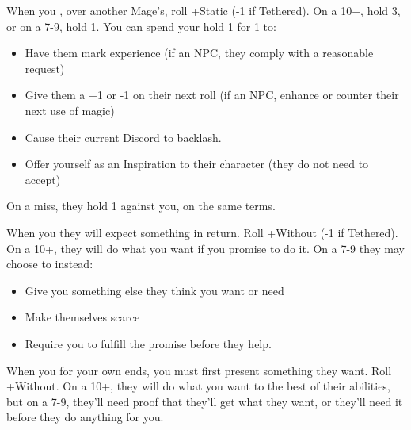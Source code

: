 



\begin{multicols}{3}

  \begin{move}
    When you ,  over another Mage’s, roll +Static (-1 if Tethered). On a 10+, hold 3, or on a 7-9, hold 1. You can spend your hold 1 for 1 to:

    \begin{itemize}
      \setlength\itemsep{-.5em}
    \item Have them mark experience (if an NPC, they comply with a reasonable request)
    \item Give them a +1 or -1 on their next roll (if an NPC, enhance or counter their next use of magic)
    \item Cause their current Discord to backlash. 
    \item Offer yourself as an Inspiration to their character (they do not need to accept)
    \end{itemize}
    On a miss, they hold 1 against you, on the same terms.


  \end{move}

  \SEPARATOR

  \begin{move}
    When you  they will expect something in return. Roll +Without (-1 if Tethered). On a 10+, they will do what you want if you promise to do it. On a 7-9 they may choose to instead:

    \begin{itemize}
    \item Give you something else they think you want or need
    \item Make themselves scarce
    \item Require you to fulfill the promise before they help.
    \end{itemize}
  \end{move}

  \SEPARATOR

  \begin{move}
    When you  for your own ends, you must first present something they want. Roll +Without. On a 10+, they will do what you want to the best of their abilities, but on a 7-9, they’ll need proof that they’ll get what they want, or they’ll need it before they do anything for you.


\end{move}
\end{multicols}
